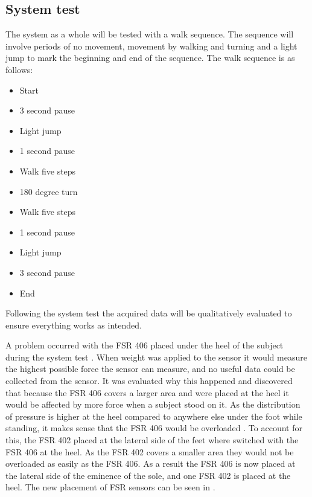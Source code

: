 \subsection{System test}
The system as a whole will be tested with a walk sequence. The sequence will involve periods of no movement, movement by walking and turning and a light jump to mark the beginning and end of the sequence. The walk sequence is as follows:
\begin{itemize}
	\item Start
	\item 3 second pause
	\item Light jump
	\item 1 second pause
	\item Walk five steps
	\item 180 degree turn
	\item Walk five steps
	\item 1 second pause
	\item Light jump
	\item 3 second pause
	\item End
\end{itemize}
Following the system test the acquired data will be qualitatively evaluated to ensure everything works as intended. 

A problem occurred with the FSR 406 placed under the heel of the subject during the system test . When weight was applied to the sensor it would measure the highest possible force the sensor can measure, and no useful data could be collected from the sensor. It was evaluated why this happened and discovered that because the FSR 406 covers a larger area and were placed at the heel it would be affected by more force when a subject stood on it. As the distribution of pressure is higher at the heel compared to anywhere else under the foot while standing, it makes sense that the FSR 406 would be overloaded \cite{Hessert2005}. To account for this, the FSR 402 placed at the lateral side of the feet where switched with the FSR 406 at the heel. As the FSR 402 covers a smaller area they would not be overloaded as easily as the FSR 406. As a result the FSR 406 is now placed at the lateral side of the eminence of the sole, and one FSR 402 is placed at the heel. The new placement of FSR sensors can be seen in .

